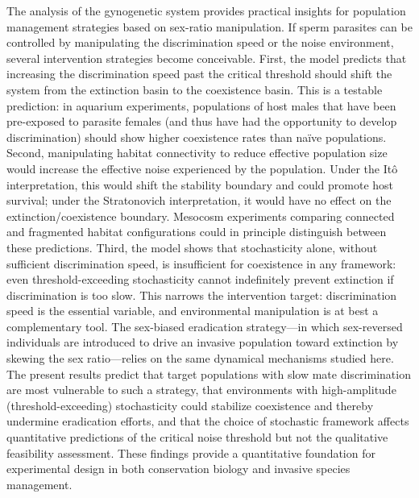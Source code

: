 \documentclass[12pt]{article}
\begin{document}
The analysis of the gynogenetic system provides practical insights for population management strategies based on sex-ratio manipulation.  If sperm parasites can be controlled by manipulating the discrimination speed or the noise environment, several intervention strategies become conceivable.  First, the model predicts that increasing the discrimination speed past the critical threshold should shift the system from the extinction basin to the coexistence basin.  This is a testable prediction: in aquarium experiments, populations of host males that have been pre-exposed to parasite females (and thus have had the opportunity to develop discrimination) should show higher coexistence rates than na\"ive populations.  Second, manipulating habitat connectivity to reduce effective population size would increase the effective noise experienced by the population.  Under the It\^{o} interpretation, this would shift the stability boundary and could promote host survival; under the Stratonovich interpretation, it would have no effect on the extinction/coexistence boundary.  Mesocosm experiments comparing connected and fragmented habitat configurations could in principle distinguish between these predictions.  Third, the model shows that stochasticity alone, without sufficient discrimination speed, is insufficient for coexistence in any framework: even threshold-exceeding stochasticity cannot indefinitely prevent extinction if discrimination is too slow.  This narrows the intervention target: discrimination speed is the essential variable, and environmental manipulation is at best a complementary tool.  The sex-biased eradication strategy---in which sex-reversed individuals are introduced to drive an invasive population toward extinction by skewing the sex ratio---relies on the same dynamical mechanisms studied here.  The present results predict that target populations with slow mate discrimination are most vulnerable to such a strategy, that environments with high-amplitude (threshold-exceeding) stochasticity could stabilize coexistence and thereby undermine eradication efforts, and that the choice of stochastic framework affects quantitative predictions of the critical noise threshold but not the qualitative feasibility assessment.  These findings provide a quantitative foundation for experimental design in both conservation biology and invasive species management.


\end{document}
